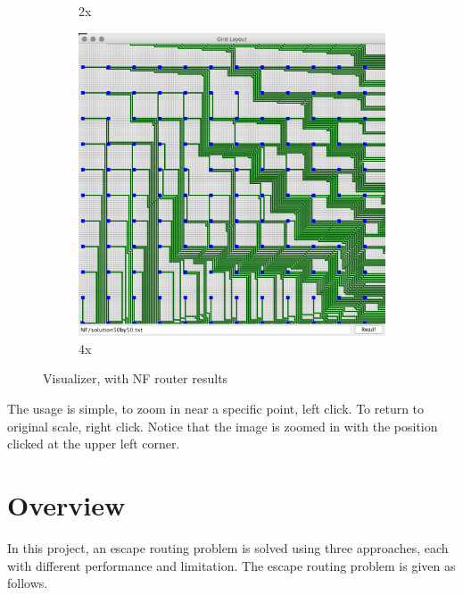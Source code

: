 \documentclass{article}
\begin{document}
\begin{spacing}{1.1}
\begin{figure}[H]
\begin{subfigure}{0.25\textwidth}
            \caption{2x}
        \end{subfigure}
        \begin{subfigure}{0.25\textwidth}
            \includegraphics[width = \textwidth]{vis3.png}
            \caption{4x}
        \end{subfigure}
        \caption{Visualizer, with NF router results}
    \end{figure}
    The usage is simple, to zoom in near a specific point, left click. To return to original scale, right click. Notice that the image is zoomed in with the position clicked at the upper left corner.
    \newpage
    \section{Overview}
    In this project, an escape routing problem is solved using three approaches, each with different performance and limitation. The escape routing problem is given as follows.


\end{spacing}
\end{document}

